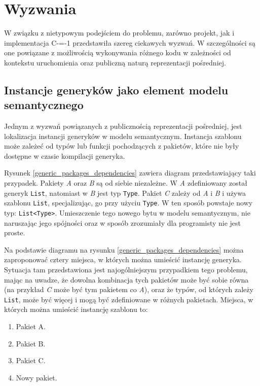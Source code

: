 \section{Wyzwania}

W związku z nietypowym podejściem do problemu, zarówno projekt, jak i implementacja C-=-1 przedstawiła szereg ciekawych wyzwań.
W szczególności są one powiązane z możliwością wykonywania różnego kodu w zależności od kontekstu uruchomienia oraz publiczną naturą reprezentacji pośredniej.

\subsection{Instancje generyków jako element modelu semantycznego}
Jednym z wyzwań powiązanych z publicznością reprezentacji pośredniej, jest lokalizacja instancji generyków w modelu semantycznym.
Instancja szablonu może zależeć od typów lub funkcji pochodzących z pakietów, które nie były dostępne w czasie kompilacji generyka.

Rysunek \ref{generic_packages_dependencies} zawiera diagram przedstawiający taki przypadek.
Pakiety \emph{A} oraz \emph{B} są od siebie niezależne.
W \emph{A} zdefiniowany został generyk \lstinline{List}, natomiast w \emph{B} jest typ \lstinline{Type}.
Pakiet \emph{C} zależy od \emph{A} i \emph{B} i używa szablonu \lstinline{List}, specjalizując, go przy użyciu \lstinline{Type}.
W ten sposób powstaje nowy typ: \lstinline{List<Type>}.
Umieszczenie tego nowego bytu w modelu semantycznym, nie naruszając jego spójności oraz w sposób zrozumiały dla programisty nie jest proste.

Na podstawie diagramu na rysunku \ref{generic_packages_dependencies} można zaproponować cztery miejsca, w których można umieścić instancję generyka.
Sytuacja tam przedstawiona jest najogólniejszym przypadkiem tego problemu, mając na uwadze, że dowolna kombinacja tych pakietów może być sobie równa (na przykład \emph{C} może być tym pakietem co \emph{A}), oraz że typów, od których zależy \lstinline{List}, może być więcej i mogą być zdefiniowane w różnych pakietach.
Miejsca, w których można umieścić instancję szablonu to: \begin{enumerate}
	\item \label{generic_location:A} Pakiet A.
	\item \label{generic_location:B} Pakiet B.
	\item \label{generic_location:C} Pakiet C.
	\item \label{generic_location:new} Nowy pakiet.
\end{enumerate}


